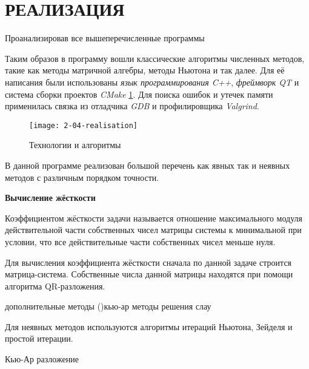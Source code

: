 \section{РЕАЛИЗАЦИЯ}

Проанализировав все вышеперечисленные программы 

Таким образов в программу вошли классические алгоритмы численных методов, такие как методы матричной алгебры, методы
Ньютона и так далее. Для её написания были использованы \textit{язык программирования C++}, \textit{фреймворк QT} и система сборки
проектов \textit{CMake} \ref{fig:stack}.
Для поиска ошибок и утечек памяти применилась связка из отладчика \textit{GDB} и профилировщика \textit{Valgrind}. 

\begin{figure}
    \texttt{[image: 2-04-realisation]}
    \caption{Технологии и алгоритмы}
    \label{fig:stack}
\end{figure}

В данной программе реализован большой перечень как явных так и неявных методов с различным порядком точности.




\textbf{Вычисление жёсткости}

Коэффициентом жёсткости задачи называется отношение максимального модуля действительной части собственных чисел матрицы системы к
минимальной при условии, что все действительные части собственных чисел меньше нуля.

Для вычисления коэффициента жёсткости сначала по данной задаче строится матрица-система. Собственные числа данной матрицы находятся
при помощи алгоритма QR-разложения.

дополнительные методы ()кью-ар
методы решения слау


Для неявных методов используются алгоритмы итераций Ньютона, Зейделя и простой итерации.


Кью-Ар разложение 

